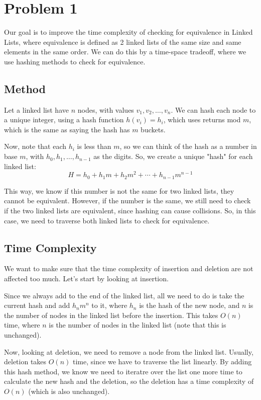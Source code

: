 \documentclass{cs1204}
\author{Rushil Gupta}
\begin{document}
\section*{Problem 1}

Our goal is to improve the time complexity of checking for equivalence in Linked Lists, where equivalence is defined as 2 linked lists of the same size and same elements in the same order. We can do this by a time-space tradeoff, where we use hashing methods to check for equivalence.

\subsection*{Method}

Let a linked list have $n$ nodes, with values $v_1, v_2, \ldots, v_n$. We can hash each node to a unique integer, using a hash function $h(v_i) = h_i$, which uses returns mod $m$, which is the same as saying the hash has $m$ buckets.

Now, note that each $h_i$ is less than $m$, so we can think of the hash as a number in base $m$, with $h_0, h_1, \ldots, h_{n-1}$ as the digits. So, we create a unique "hash" for each linked list: \\

\[ H = h_{0} + h_{1}m + h_{2}m^2 + \cdots + h_{n-1}m^{n-1} \]

This way, we know if this number is not the same for two linked lists, they cannot be equivalent. However, if the number is the same, we still need to check if the two linked lists are equivalent, since hashing can cause collisions. So, in this case, we need to traverse both linked lists to check for equivalence.

\subsection*{Time Complexity}

We want to make sure that the time complexity of insertion and deletion are not affected too much. Let's start by looking at insertion.

Since we always add to the end of the linked list, all we need to do is take the current hash and add $h_nm^n$ to it, where $h_n$ is the hash of the new node, and $n$ is the number of nodes in the linked list before the insertion. This takes $O(n)$ time, where $n$ is the number of nodes in the linked list (note that this is unchanged).

Now, looking at deletion, we need to remove a node from the linked list. Usually, deletion takes $O(n)$ time, since we have to traverse the list linearly. By adding this hash method, we know we need to iteratre over the list one more time to calculate the new hash and the deletion, so the deletion has a time complexity of $O(n)$ (which is also unchanged).
\end{document}
